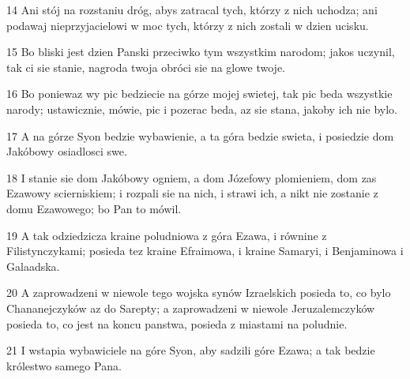 \par 14 Ani stój na rozstaniu dróg, abys zatracal tych, którzy z nich uchodza; ani podawaj nieprzyjacielowi w moc tych, którzy z nich zostali w dzien ucisku.
\par 15 Bo bliski jest dzien Panski przeciwko tym wszystkim narodom; jakos uczynil, tak ci sie stanie, nagroda twoja obróci sie na glowe twoje.
\par 16 Bo poniewaz wy pic bedziecie na górze mojej swietej, tak pic beda wszystkie narody; ustawicznie, mówie, pic i pozerac beda, az sie stana, jakoby ich nie bylo.
\par 17 A na górze Syon bedzie wybawienie, a ta góra bedzie swieta, i posiedzie dom Jakóbowy osiadlosci swe.
\par 18 I stanie sie dom Jakóbowy ogniem, a dom Józefowy plomieniem, dom zas Ezawowy scierniskiem; i rozpali sie na nich, i strawi ich, a nikt nie zostanie z domu Ezawowego; bo Pan to mówil.
\par 19 A tak odziedzicza kraine poludniowa z góra Ezawa, i równine z Filistynczykami; posieda tez kraine Efraimowa, i kraine Samaryi, i Benjaminowa i Galaadska.
\par 20 A zaprowadzeni w niewole tego wojska synów Izraelskich posieda to, co bylo Chananejczyków az do Sarepty; a zaprowadzeni w niewole Jeruzalemczyków posieda to, co jest na koncu panstwa, posieda z miastami na poludnie.
\par 21 I wstapia wybawiciele na góre Syon, aby sadzili góre Ezawa; a tak bedzie królestwo samego Pana.


